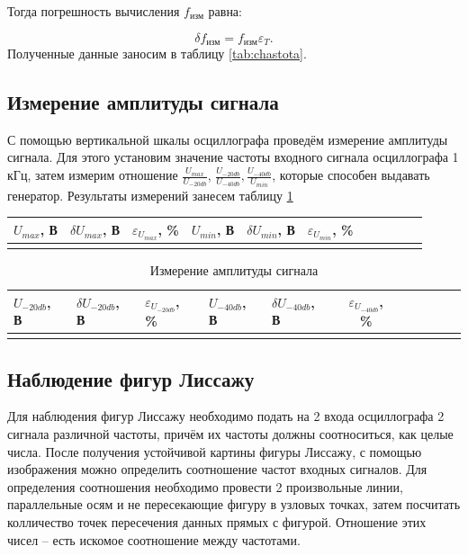 \documentclass[a4paper,12pt]{article} %
\begin{document}
	Тогда погрешность вычисления $ f_\text{изм} $ равна:
	
	\begin{equation}
		\delta f_\text{изм} = f_\text{изм}\varepsilon_T.
	\end{equation}
	Полученные данные заносим в таблицу \ref{tab:chastota}.
	
	\subsection{Измерение амплитуды сигнала}
	
	С помощью вертикальной шкалы осциллографа проведём измерение амплитуды сигнала. Для этого установим значение частоты входного сигнала осциллографа 1 кГц, затем измерим отношение $ \frac{U_{max}}{U_{-20db}} $, $ \frac{U_{-20db}}{U_{-40db}} , \frac{U_{-40db}}{U_{min}}$, которые способен выдавать генератор. Результаты измерений занесем  таблицу \ref{tab:my-table}
	
	\begin{table}[H]
		\centering
		\begin{tabular}{|p{2.1cm}|p{2.1cm}|p{2.1cm}|p{2.1cm}|p{2.1cm}|c|c|c|c|c|c|}
			\hline
			$ U_{max} $, В & $ \delta U_{max} $, В & $ \varepsilon_{U_{max}} $, \% & $ U_{min} $, В & $ \delta U_{min} $, В & $ \varepsilon_{U_{min}} $, \% \\ \hline
			 & &  &  &  &   \\ \hline
		\end{tabular}
	\end{table}	
	\vspace{-1cm}
	\begin{table}[H]
		\centering
		\begin{tabular}{|p{2cm}|p{2cm}|p{2cm}|p{2cm}|p{2cm}|c|c|c|c|c|c|}
			\hline
			$ U_{-20db} $, В & $ \delta U_{-20db} $, В & $ \varepsilon_{U_{-20db}} $, \% & $ U_{-40db} $, В & $ \delta U_{-40db} $, В & $ \varepsilon_{U_{-40db}} $, \% \\ \hline
			& &  &  &  &   \\ \hline
		\end{tabular}
		\caption{Измерение амплитуды сигнала}
		\label{tab:my-table}
	\end{table}	
	\newpage
	
	\subsection{Наблюдение фигур Лиссажу}
	
	Для наблюдения фигур Лиссажу необходимо подать на 2 входа осциллографа 2 	сигнала различной частоты, причём их частоты должны соотноситься, как целые числа. После получения устойчивой картины фигуры Лиссажу, с помощью изображения можно определить соотношение частот входных сигналов. Для определения соотношения необходимо провести 2 произвольные линии, параллельные осям и не пересекающие фигуру в узловых точках, затем посчитать колличество точек пересечения данных прямых с фигурой. Отношение этих чисел -- есть искомое соотношение между частотами.			
	
\end{document}
